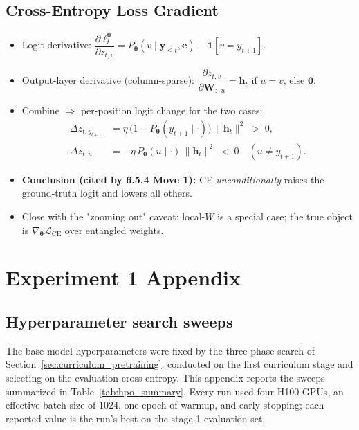 \documentclass[titlepage,a4paper,11pt]{report}
\begin{document}
    \subsection{Cross-Entropy Loss Gradient}\label{app:obj_ce}
    \begin{itemize}
        \item Logit derivative:
              $\dfrac{\partial \ell_t^{\bm\theta}}{\partial z_{t,v}}
               = P_{\bm\theta}(v\mid\bm y_{\le t},\bm e) - \mathbf{1}[v=y_{t+1}]$.
        \item Output-layer derivative (column-sparse):
              $\dfrac{\partial z_{t,v}}{\partial \bm W_{:,u}} = \bm h_t$ if $u=v$, else $\bm 0$.
        \item Combine $\Rightarrow$ per-position logit change for the two cases:
        \begin{align}
            \Delta z_{t,y_{t+1}} &= \eta\,\bigl(1 - P_{\bm\theta}(y_{t+1}\mid\cdot)\bigr)\,\|\bm h_t\|^2 \;>\;0,\\
            \Delta z_{t,u} &= -\eta\,P_{\bm\theta}(u\mid\cdot)\,\|\bm h_t\|^2 \;<\;0 \quad (u\neq y_{t+1}).
        \end{align}
        \item \textbf{Conclusion (cited by 6.5.4 Move 1):} CE \emph{unconditionally}
              raises the ground-truth logit and lowers all others.
        \item Close with the "zooming out" caveat: local-$W$ is a special case; the true
              object is $\nabla_{\bm\theta}\mathcal{L}_{\text{CE}}$ over entangled weights.
              \cite{elhage_toy_2022, olah_zoom_2020}
    \end{itemize}



\section{Experiment 1 Appendix}
    \subsection{Hyperparameter search sweeps}\label{app:hpo}
    The base-model hyperparameters were fixed by the three-phase search of Section~\ref{sec:curriculum_pretraining}, conducted on the first curriculum stage and selecting on the evaluation cross-entropy. This appendix reports the sweeps summarized in Table~\ref{tab:hpo_summary}. Every run used four \textsc{H100} GPUs, an effective batch size of $1024$, one epoch of warmup, and early stopping; each reported value is the run's best on the stage-1 evaluation set.
    
\end{document}
